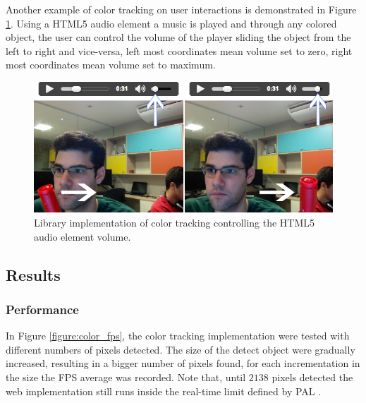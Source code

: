 Another example of color tracking on user interactions is demonstrated in Figure \ref{figure:color_volume}. Using a HTML5 audio element \cite{International2009} a music is played and through any colored object, the user can control the volume of the player sliding the object from the left to right and vice-versa, left most coordinates mean volume set to zero, right most coordinates mean volume set to maximum.

\begin{figure}[!htb]
  \centering
  \includegraphics[width=\linewidth]{chapters/evaluation/color_volume.png}
  \caption{Library implementation of color tracking controlling the HTML5 audio element volume.}
  \label{figure:color_volume}
\end{figure}


\subsection{Results} %
\label{sub:evaluation:color_tracking_algorithm:results}

\subsubsection{Performance} %
\label{subsub:evaluation:color_tracking_algorithm:results:performance}

In Figure \ref{figure:color_fps}, the color tracking implementation were tested with different numbers of pixels detected. The size of the detect object were gradually increased, resulting in a bigger number of pixels found, for each incrementation in the size the FPS average was recorded. Note that, until $2138$ pixels detected the web implementation still runs inside the real-time limit defined by PAL \cite{PAL1962}.

